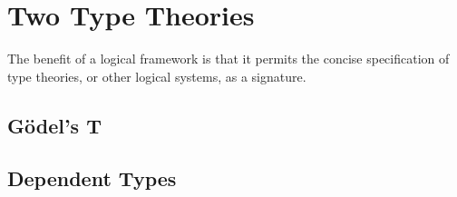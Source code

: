 \documentclass[11pt,twoside]{article}
\begin{document}
\section{Two Type Theories}

The benefit of a logical framework is that it permits the concise specification of type
theories, or other logical systems, as a signature.

\subsection{G\"odel's T}

\subsection{Dependent Types}



\end{document}
